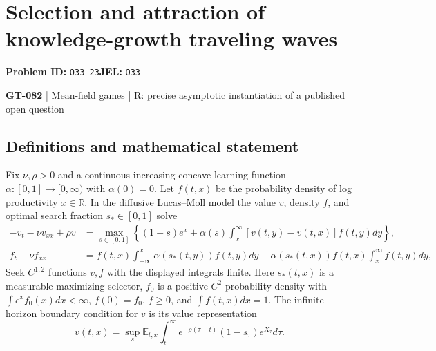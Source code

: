 \documentclass[11pt,a4paper]{article}
\begin{document}
\section*{Selection and attraction of knowledge-growth traveling waves}
\textbf{Problem ID:} \texttt{O33-23}\quad \textbf{JEL:} \texttt{O33}\par
\label{problem:OP-0212}
\label{game:GT-082}
{\sffamily\small\color{muted}
{\small\textbf{GT-082} | Mean-field games | R: precise asymptotic instantiation of a published open question\par}
\par}
\subsection*{Definitions and mathematical statement}
Fix $\nu,\rho>0$ and a continuous increasing concave learning function $\alpha:[0,1]\to[0,\infty)$ with $\alpha(0)=0$. Let $f(t,x)$ be the probability density of log productivity $x\in\mathbb R$. In the diffusive Lucas--Moll model the value $v$, density $f$, and optimal search fraction $s_*\in[0,1]$ solve
\[
 \begin{split}
 -v_t-\nu v_{xx}+\rho v
 &=\max_{s\in[0,1]}\left\{(1-s)e^x+
 \alpha(s)\int_x^\infty[v(t,y)-v(t,x)]f(t,y)dy\right\},\\
 f_t-\nu f_{xx}
 &=f(t,x)\int_{-\infty}^x\alpha(s_*(t,y))f(t,y)dy
   -\alpha(s_*(t,x))f(t,x)\int_x^\infty f(t,y)dy,
 \end{split}
\]
Seek $C^{1,2}$ functions $v,f$ with the displayed integrals finite. Here $s_*(t,x)$ is a measurable maximizing selector, $f_0$ is a positive $C^2$ probability density with $\int e^xf_0(x)dx<\infty$, $f(0)=f_0$, $f\geq0$, and $\int f(t,x)dx=1$. The infinite-horizon boundary condition for $v$ is its value representation
\[
 v(t,x)=\sup_s\mathbb E_{t,x}\int_t^\infty
       e^{-\rho(\tau-t)}(1-s_\tau)e^{X_\tau}d\tau.
\]
\end{document}
